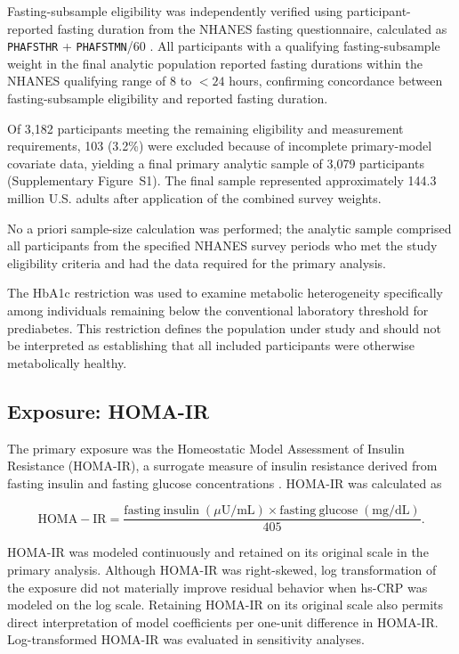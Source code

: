 \documentclass[11pt]{article}
\begin{document}
Fasting-subsample eligibility was independently verified using
participant-reported fasting duration from the NHANES fasting
questionnaire, calculated as
\texttt{PHAFSTHR} + \texttt{PHAFSTMN}/60
\citep{NHANESFasting2015,NHANESFasting2017_2020}.
All participants with a qualifying fasting-subsample weight in the
final analytic population reported fasting durations within the
NHANES qualifying range of 8 to $<24$ hours, confirming concordance
between fasting-subsample eligibility and reported fasting duration.

Of 3,182 participants meeting the remaining eligibility and measurement
requirements, 103 (3.2\%) were excluded because of incomplete primary-model
covariate data, yielding a final primary analytic sample of 3,079
participants (Supplementary Figure~S1). The final sample represented
approximately 144.3 million U.S. adults after application of the combined
survey weights.

No a priori sample-size calculation was performed; the analytic sample
comprised all participants from the specified NHANES survey periods who
met the study eligibility criteria and had the data required for the
primary analysis.

The HbA1c restriction was used to examine metabolic heterogeneity
specifically among individuals remaining below the conventional laboratory
threshold for prediabetes. This restriction defines the population under
study and should not be interpreted as establishing that all included
participants were otherwise metabolically healthy.

\subsection{Exposure: HOMA-IR}

The primary exposure was the Homeostatic Model Assessment of Insulin
Resistance (HOMA-IR), a surrogate measure of insulin resistance derived
from fasting insulin and fasting glucose concentrations
\citep{Matthews1985,Wallace2004}. HOMA-IR was calculated as

\[
\mathrm{HOMA\!-\!IR}
=
\frac{
\mathrm{fasting\ insulin}\;(\mu\mathrm{U/mL})
\times
\mathrm{fasting\ glucose}\;(\mathrm{mg/dL})
}{405}.
\]

HOMA-IR was modeled continuously and retained on its original scale in the
primary analysis. Although HOMA-IR was right-skewed, log transformation of
the exposure did not materially improve residual behavior when hs-CRP was
modeled on the log scale. Retaining HOMA-IR on its original scale also
permits direct interpretation of model coefficients per one-unit difference
in HOMA-IR. Log-transformed HOMA-IR was evaluated in sensitivity analyses.
\end{document}
